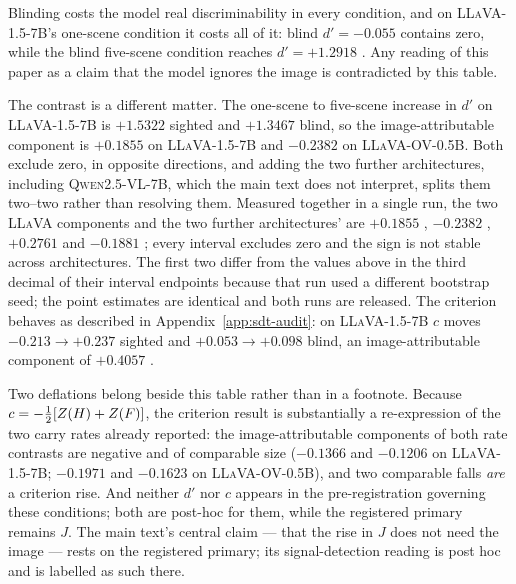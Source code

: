 Blinding costs the model real discriminability in every condition, and on \textsc{LLaVA-1.5-7B}'s
one-scene condition it costs all of it: blind $d' = -0.055$  contains zero, while
the blind five-scene condition reaches $d' = +1.2918$ . Any reading of this
paper as a claim that the model ignores the image is contradicted by this table.

The contrast is a different matter. The one-scene to five-scene increase in $d'$ on \textsc{LLaVA-1.5-7B} is $+1.5322$  sighted and $+1.3467$  blind, so the
image-attributable component is $+0.1855$  on \textsc{LLaVA-1.5-7B} and
$-0.2382$  on \textsc{LLaVA-OV-0.5B}. Both exclude zero, in opposite directions, and adding
the two further architectures, including \textsc{Qwen2.5-VL-7B}, which the main text does not
interpret, splits them two--two rather than resolving them. Measured together in
a single run, the two \textsc{LLaVA} components and the two further architectures' are $+0.1855$ , $-0.2382$
, $+0.2761$  and $-0.1881$ ;
every interval excludes zero and the sign is not stable across architectures. The first two differ
from the values above in the third decimal of their interval endpoints because that run used a
different bootstrap seed; the point estimates are identical and both runs are released. The
criterion behaves as described in Appendix~\ref{app:sdt-audit}: on \textsc{LLaVA-1.5-7B} $c$ moves
$-0.213 \rightarrow +0.237$ sighted and $+0.053 \rightarrow +0.098$ blind, an image-attributable
component of $+0.4057$ .

Two deflations belong beside this table rather than in a footnote. Because
$c = -\tfrac{1}{2}[Z(H) + Z(F)]$, the criterion result is substantially a re-expression of
the two carry rates already reported: the image-attributable components of both rate contrasts are negative and of comparable size
($-0.1366$  and $-0.1206$  on \textsc{LLaVA-1.5-7B};
$-0.1971$  and $-0.1623$  on \textsc{LLaVA-OV-0.5B}), and two
comparable falls \emph{are} a criterion rise. And neither $d'$ nor $c$ appears in the pre-registration
governing these conditions; both are post-hoc for them, while the registered primary remains $J$.
The main text's central claim --- that the rise in $J$ does not need the image --- rests on the
registered primary; its signal-detection reading is post hoc and is labelled as such there.

